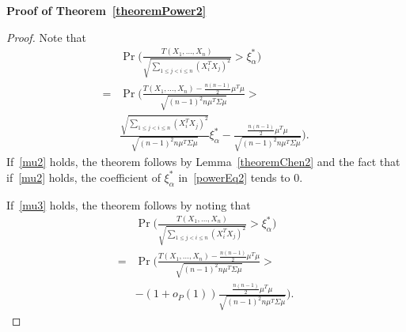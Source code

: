 \documentclass[smallcondensed,final,natbib]{svjour3}          %
\begin{document}
\textbf{Proof of Theorem~\ref{theoremPower2}}
\begin{proof}
    Note that
    \begin{align}
            &\Pr\bigg(\frac{T( X_1,\ldots, X_n)}{\sqrt{\sum_{1\leq j<i\leq n}{(X_i^T X_j)}^2}}>\xi_{\alpha}^* \bigg)\nonumber\\
            =&
            \Pr\bigg(\frac{T( X_1,\ldots, X_n)-\frac{n(n-1)}{2}\mu^T\mu}{\sqrt{{(n-1)}^2 n \mu^T\Sigma\mu}}>
            \nonumber\\
            &\frac{\sqrt{\sum_{1\leq j<i\leq n}{{(X_i^T X_j)}^2}}}{\sqrt{{(n-1)}^2 n \mu^T\Sigma\mu}}\xi_{\alpha}^*-\frac{\frac{n(n-1)}{2}\mu^T\mu}{\sqrt{{(n-1)}^2 n \mu^T\Sigma\mu}} \bigg).
            \label{powerEq2}
    \end{align}
    If~\eqref{mu2} holds, the theorem follows by Lemma~\ref{theoremChen2} and the fact that if~\eqref{mu2} holds, the coefficient of $\xi_\alpha^*$ in~\eqref{powerEq2} tends to $0$.

    If~\eqref{mu3} holds, the theorem follows by noting that
    \begin{equation*}
        \begin{aligned}
            &\Pr\bigg(\frac{T( X_1,\ldots, X_n)}{\sqrt{\sum_{1\leq j<i\leq n}{(X_i^T X_j)}^2}}>\xi_{\alpha}^* \bigg)\\
            =&
            \Pr\bigg(\frac{T( X_1,\ldots, X_n)-\frac{n(n-1)}{2}\mu^T\mu}{\sqrt{{(n-1)}^2 n \mu^T\Sigma\mu}}>\\
            &-(1+o_P(1))\frac{\frac{n(n-1)}{2}\mu^T\mu}{\sqrt{{(n-1)}^2 n \mu^T\Sigma\mu}} \bigg).
        \end{aligned}
    \end{equation*}
\end{proof}
\end{document}

